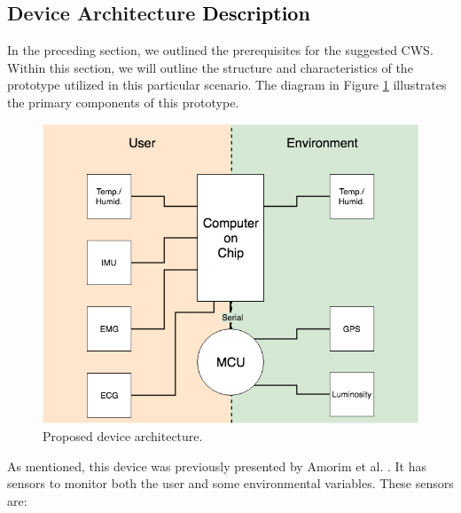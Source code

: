 \subsection{Device Architecture \textcolor{black}{Description}}

In the preceding section, we outlined the prerequisites for the suggested CWS. Within this section, we will outline the structure and characteristics of the prototype utilized in this particular scenario. The diagram in Figure \ref{fig:devicearch} illustrates the primary components of this prototype.

\begin{figure}[h!]
    \centering
    \includegraphics[width = .6\linewidth]{Figures/devicearch.png}
    \caption{Proposed device architecture.}
    \label{fig:devicearch}
\end{figure}

As mentioned, this device was previously presented by Amorim et al. \cite{jp2019software}. It has sensors to monitor both the user and some environmental variables. These sensors are:

